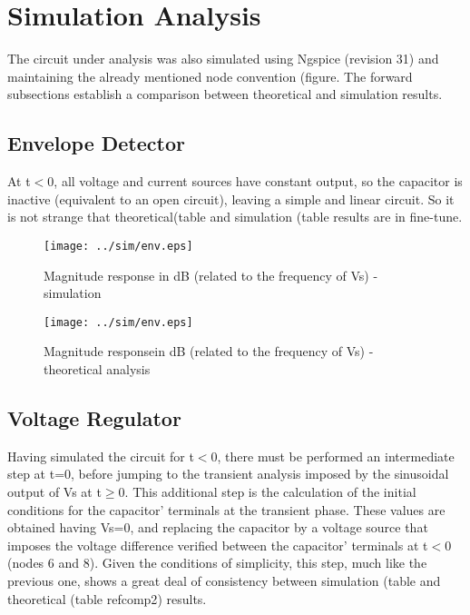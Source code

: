 \section{Simulation Analysis}
\label{sec:simulation}

The circuit under analysis was also simulated using Ngspice (revision 31) and maintaining the already mentioned node convention (figure. The forward subsections establish a comparison between theoretical and simulation results.

\subsection{Envelope Detector}

At t$<$0, all voltage and current sources have constant output, so the capacitor is inactive (equivalent to an open circuit), leaving a simple and linear circuit. So it is not strange that theoretical(table and simulation (table results are in fine-tune.


\begin{figure}[h] \centering
  \begin{minipage}{.5\textwidth}
    \texttt{[image: ../sim/env.eps]}
    \caption{Magnitude response in dB (related to the frequency of Vs) - simulation}
    \label{fig:simenv}
    \end{minipage}%
  \begin{minipage}{.5\textwidth}
  \centering
    \texttt{[image: ../sim/env.eps]}
    \caption{Magnitude responsein dB (related to the frequency of Vs) - theoretical analysis }
    \label{fig:compenv}
      \end{minipage}%
\end{figure}

\subsection{Voltage Regulator}

Having simulated the circuit for t$<$0, there must be performed an intermediate step at t=0, before jumping to the transient analysis imposed by the sinusoidal output of Vs at t$\geq$0. This additional step is the calculation of the initial conditions for the capacitor' terminals at the transient phase. These values are obtained having Vs=0, and replacing the capacitor by a voltage source that imposes the voltage difference verified between the capacitor' terminals at t$<$0 (nodes 6 and 8). Given the conditions of simplicity, this step, much like the previous one, shows a great deal of consistency between simulation (table  and theoretical (table ref{comp2}) results. 




